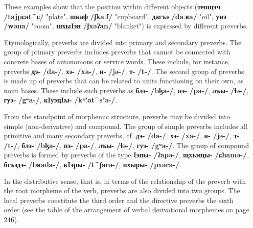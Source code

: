 \documentclass[a4paper,12pt]{book}
\newcommand{\1}[1]{\textbf{\emph{#1}}} %
\newcommand{\2}[1]{\textbf{[#1]}} %
\newcommand{\3}[1]{\fontsize{11pt}{0cm}\textbf{\emph{#1}}} %
\newcommand{\4}[1]{\fontsize{10pt}{0cm}\emph{#1}}	%
\newcommand{\5}[1]{\textbf{/#1/}} %
\newcommand{\6}[1]{\textbf{[#1]}} %
\newcommand{\7}[1]{\fontsize{12pt}{0cm}\emph{#1}} %
\newcommand{\8}[1]{\fontsize{12pt}{0cm}`#1'} %
\newcommand{\9}[1]{\fontsize{12pt}{0cm}(lit. `#1')} %
\newcommand{\glossphonemics}[1]{\textbf{/#1/}} %
\begin{document}
These examples show that the position within different objects (\textbf{тепщэч} \glossphonemics{tajpɕat⁀ɕ} "plate", \textbf{шкаф} \glossphonemics{ʃkaːf} "cupboard", \textbf{дагъэ} \glossphonemics{daːʁa} "oil", \textbf{унэ} \glossphonemics{wəna} "room", \textbf{шхыIэн} \glossphonemics{ʃxəʔan} "blanket") is expressed by different preverbs.

Etymologically, preverbs are divided into primary and secondary preverbs. The group of primary preverbs includes preverbs that cannot be connected with concrete bases of autonomous or service words. These include, for instance, preverbs \textbf{дэ-} \glossphonemics{da-}, \textbf{хэ-} \glossphonemics{xa-}, \textbf{и-} \glossphonemics{jə-}, \textbf{т-} \glossphonemics{t-}. The second group of preverbs is made up of preverbs that can be related to units functioning on their own, as noun bases. These include such preverbs as \textbf{блэ-} \glossphonemics{bɮa-}, \textbf{пэ-} \glossphonemics{pa-}, \textbf{лъы-} \glossphonemics{ɬə-}, \textbf{гуэ-} \glossphonemics{gʷa-}, \textbf{кIуэцIы-} \glossphonemics{kʷʼat⁀sʼə-}.

From the standpoint of morphemic structure, preverbs may be divided into simple (non-derivative) and compound. The group of simple preverbs includes all primitive and many secondary preverbs, cf. \textbf{дэ-} \glossphonemics{da-}, \textbf{хэ-} \glossphonemics{xa-}, \textbf{и-} \glossphonemics{jə-}, \textbf{т-} \glossphonemics{t-}, \textbf{блэ-} \glossphonemics{bɮa-}, \textbf{пэ-} \glossphonemics{pa-}, \textbf{лъы-} \glossphonemics{ɬə-}, \textbf{гуэ-} \glossphonemics{gʷa-}. The group of compound preverbs is formed by preverbs of the type \textbf{Iэпы-} \glossphonemics{ʔapə-}, \textbf{щхьэщы-} \glossphonemics{ɕħamə-}, \textbf{бгъэдэ-} \glossphonemics{bʁada-}, \textbf{кIэры-} \glossphonemics{t⁀ʃarə-}, \textbf{пхыры-} \glossphonemics{pxərə-}.

In the distributive sense, that is, in terms of the relationship of the preverb with the root morpheme of the verb, preverbs are also divided into two groups. The local preverbs constitute the third order and the directive preverbs the sixth order (see the table of the arrangement of verbal derivational morphemes on page 246).
\end{document}
